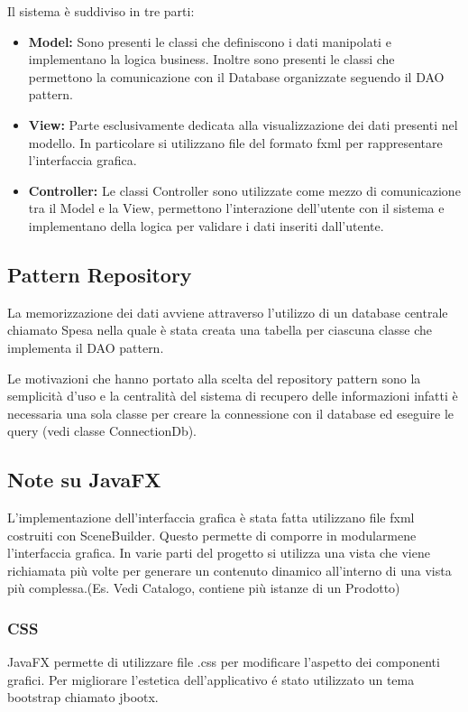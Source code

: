 \documentclass{article}
\begin{document}
\noindent Il sistema è suddiviso in tre parti:
\begin{itemize}
	\item{\textbf{Model:}
	      Sono presenti le classi che definiscono i dati manipolati
	      e implementano la logica business.
	      Inoltre sono presenti le classi che permettono la comunicazione
	      con il Database organizzate seguendo il DAO pattern.
	      }
	\item{\textbf{View:}
	      Parte esclusivamente dedicata alla visualizzazione dei dati
	      presenti nel modello.
	      In particolare si utilizzano file del formato fxml per rappresentare
	      l'interfaccia grafica.
	      }
	\item{\textbf{Controller:}
	      Le classi Controller sono utilizzate come mezzo di comunicazione
	      tra il Model e la View, permettono l'interazione dell'utente con il
	      sistema e implementano della logica per validare i dati inseriti dall'utente.
	      }
\end{itemize}

\subsection{Pattern Repository}
\noindent La memorizzazione dei dati avviene attraverso l'utilizzo di un database centrale chiamato Spesa nella quale è stata creata una tabella per ciascuna classe che implementa il DAO pattern.

Le motivazioni che hanno portato alla scelta del repository pattern sono la semplicità d'uso e la centralità del sistema di recupero delle informazioni infatti è necessaria una sola classe per creare la connessione con il database ed eseguire le query (vedi classe ConnectionDb).
\subsection{Note su JavaFX}
L'implementazione dell'interfaccia grafica è stata fatta utilizzano file fxml costruiti con SceneBuilder.
Questo permette di comporre in modularmene l'interfaccia grafica.
In varie parti del progetto si utilizza una vista che viene richiamata più volte per generare un contenuto
dinamico all'interno di una vista più complessa.(Es. Vedi Catalogo, contiene più istanze di un Prodotto)
\subsubsection{CSS}
JavaFX permette di utilizzare file .css per modificare l'aspetto dei componenti grafici.
Per migliorare l'estetica dell'applicativo é stato utilizzato un tema bootstrap chiamato jbootx.
\end{document}
